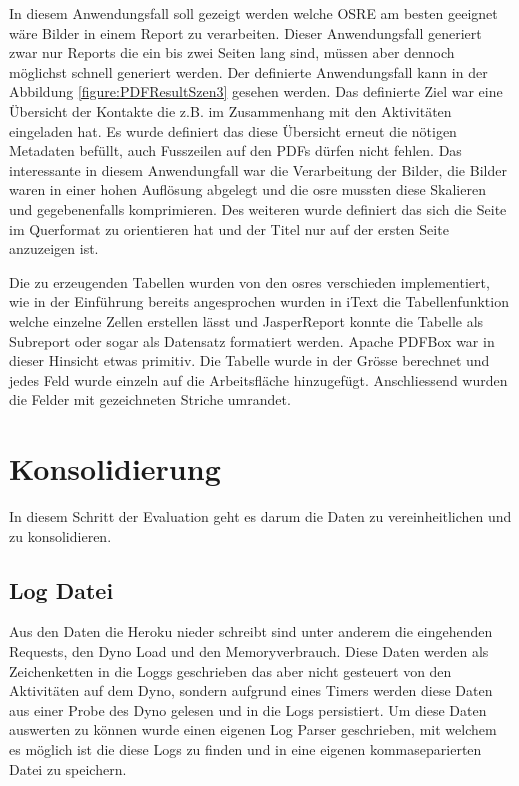 \documentclass[main.tex]{subfiles}
\begin{document}
In diesem Anwendungsfall soll gezeigt werden welche  OSRE am besten geeignet wäre Bilder in einem Report zu verarbeiten. Dieser Anwendungsfall generiert zwar nur Reports die ein bis zwei Seiten lang sind, müssen aber dennoch möglichst schnell generiert werden. 
Der definierte Anwendungsfall kann in der Abbildung \ref{figure:PDFResultSzen3} gesehen werden. Das definierte Ziel war eine Übersicht der Kontakte die z.B. im Zusammenhang mit den Aktivitäten eingeladen hat. Es wurde definiert das diese Übersicht erneut die nötigen Metadaten befüllt, auch Fusszeilen auf den PDFs dürfen nicht fehlen. Das interessante in diesem Anwendungfall war die Verarbeitung der Bilder, die Bilder waren in einer hohen Auflösung abgelegt und die \acrlong{osre} mussten diese Skalieren und gegebenenfalls komprimieren. 
Des weiteren wurde definiert das sich die Seite im Querformat zu orientieren hat und der Titel nur auf der ersten Seite anzuzeigen ist. 

Die zu erzeugenden Tabellen wurden von den \acrlong{osre}s verschieden implementiert, wie in der Einführung bereits angesprochen wurden in iText die Tabellenfunktion welche einzelne Zellen erstellen lässt und JasperReport konnte die Tabelle als Subreport oder sogar als Datensatz formatiert werden. Apache PDFBox war in dieser Hinsicht etwas primitiv. Die Tabelle wurde in der Grösse berechnet und jedes Feld wurde einzeln auf die Arbeitsfläche hinzugefügt. Anschliessend wurden die Felder mit gezeichneten Striche umrandet.



\section{Konsolidierung}
In diesem Schritt der Evaluation geht es darum die Daten zu vereinheitlichen und zu konsolidieren.

\subsection{Log Datei}

Aus den Daten die Heroku nieder schreibt sind unter anderem die eingehenden Requests, den Dyno Load und den Memoryverbrauch. Diese Daten werden als Zeichenketten in die Loggs geschrieben das aber nicht gesteuert von den Aktivitäten auf dem Dyno, sondern aufgrund eines Timers werden diese Daten aus einer Probe des Dyno gelesen und in die Logs persistiert. Um diese Daten auswerten zu können wurde einen eigenen Log Parser geschrieben, mit welchem es möglich ist die diese Logs zu finden und in eine eigenen kommaseparierten Datei zu speichern.   
\end{document}
